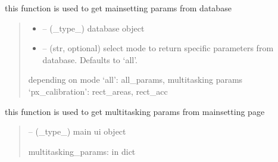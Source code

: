 \documentclass[letterpaper,10pt,english]{sphinxmanual}
\begin{document}
\begin{savenotes}\begin{fulllineitems}
\label{\detokenize{setting/backend/mainsetting_funcs:oxin.backend.mainsetting_funcs.get_mainsetting_params_from_db}}
\pysigstartsignatures
{}
\pysigstopsignatures
\sphinxAtStartPar
this function is used to get mainsetting params from database
\begin{quote}\begin{description}
\begin{itemize}
\item {} 
\sphinxAtStartPar
{} – (\_type\_) database object

\item {} 
\sphinxAtStartPar
{} – (str, optional) select mode to return specific parameters from database. Defaults to ‘all’.

\end{itemize}

\sphinxAtStartPar
depending on mode
‘all’: all\_params, multitasking params
‘px\_calibration’: rect\_areas, rect\_acc

\end{description}\end{quote}

\end{fulllineitems}\end{savenotes}


\begin{savenotes}\begin{fulllineitems}
\label{\detokenize{setting/backend/mainsetting_funcs:oxin.backend.mainsetting_funcs.get_multitasking_params_from_ui}}
\pysigstartsignatures
{}
\pysigstopsignatures
\sphinxAtStartPar
this function is used to get multitasking params from main\sphinxhyphen{}setting page
\begin{quote}\begin{description}
\sphinxAtStartPar
{} – (\_type\_) main ui object

\sphinxAtStartPar
multitasking\_params: in dict

\end{description}\end{quote}

\end{fulllineitems}\end{savenotes}
\end{document}
